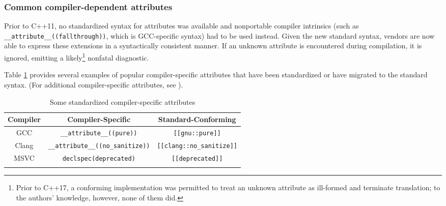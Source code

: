 \subsubsection[Common compiler-dependent attributes]{Common compiler-dependent attributes}\label{common-compiler-dependent-attributes}

Prior to C++11, no standardized syntax for attributes was available and nonportable compiler intrinsics
(such as \mbox{\lstinline!__attribute__((fallthrough))!}, which is
GCC-specific syntax) had to be used instead. Given the new standard
syntax, vendors are now able to express these extensions in a syntactically consistent manner. If an unknown attribute is
encountered during compilation, it is ignored, emitting a likely{\cprotect\footnote{Prior to C++17, a conforming implementation was
permitted to treat an unknown attribute as ill-formed and terminate
  translation; to the authors' knowledge, however, none of them did.}} nonfatal
diagnostic.

Table \ref{attribute-table1} provides several examples of popular compiler-specific attributes
that have been standardized or have migrated to the standard syntax. (For
additional compiler-specific attributes, see ).

\begin{table}[h!]
\begin{center}
\begin{threeparttable}
\caption{Some standardized compiler-specific attributes}\label{attribute-table1}\vspace{1.5ex}
{\small \begin{tabular}{c|c|c}\thickhline
\rowcolor[gray]{.9}   {\sffamily\bfseries Compiler} & {\sffamily\bfseries Compiler-Specific} &
{\sffamily\bfseries Standard-Conforming} \\ \hline
GCC &\lstinline!__attribute__((pure))! & \lstinline![[gnu::pure]]! \\ \hline
Clang & \lstinline!__attribute__((no_sanitize))! &\lstinline![[clang::no_sanitize]]! \\ \hline
MSVC & \lstinline!declspec(deprecated)! & \lstinline![[deprecated]]! \\ \thickhline
\end{tabular}
}
\end{threeparttable}
\end{center}
\end{table}

